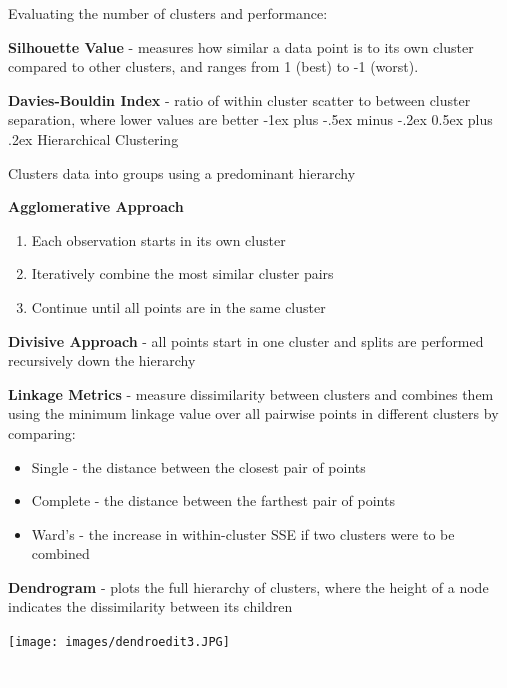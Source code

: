 \documentclass[10pt,landscape]{article}
\makeatletter
\renewcommand{\subsection}{\@startsection{subsection}{2}{0mm}%
                                {-1ex plus -.5ex minus -.2ex}%
                                {0.5ex plus .2ex}%
                                {\normalfont\normalsize\bfseries}}
\makeatother
\begin{document}
\begin{multicols}{3}
Evaluating the number of clusters and performance:

\textbf{Silhouette Value} - measures how similar a data point is to its own cluster compared to other clusters, and ranges from 1 (best) to -1 (worst).

\textbf{Davies-Bouldin Index} - ratio of within cluster scatter to between cluster separation, where lower values are better
\subsection{Hierarchical Clustering}

Clusters data into groups using a predominant hierarchy

\textbf{Agglomerative Approach}
\begin{enumerate}[leftmargin=5mm]
\itemsep -.4mm
\item Each observation starts in its own cluster
\item Iteratively combine the most similar cluster pairs
\item Continue until all points are in the same cluster
\end{enumerate}

\textbf{Divisive Approach} - all points start in one cluster and splits are performed recursively down the hierarchy

\textbf{Linkage Metrics} - measure dissimilarity between clusters and combines them using the minimum linkage value over all pairwise points in different clusters by comparing:
\begin{itemize}[label={--},leftmargin=4mm]
\itemsep -.4mm
\item Single - the distance between the closest pair of points
\item Complete - the distance between the farthest pair of points
\item Ward's - the increase in within-cluster SSE if two clusters were to be combined
\end{itemize}
\textbf{Dendrogram} - plots the full hierarchy of clusters, where the height of a node indicates the dissimilarity between its children
\begin{center}
    \texttt{[image: images/dendroedit3.JPG]}
\end{center}

\columnbreak
\textcolor{white}{.}\vspace{-5mm}\\ %

\end{multicols}
\end{document}
